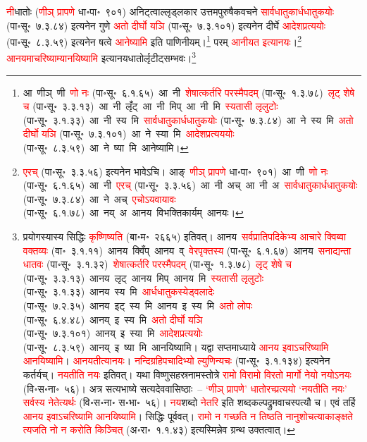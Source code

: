 \fontsize{14}{21}\selectfont\begin{sloppypar}\justifying\noindent\hspace{10mm} \textcolor{red}{नी}\-धातोः (\textcolor{red}{णीञ् प्रापणे} धा॰पा॰~९०१) अनिट्त्वाल्लृड्लकार उत्तम\-पुरुषैक\-वचने \textcolor{red}{सार्वधातुकार्धधातुकयोः} (पा॰सू॰~७.३.८४) इत्यनेन गुणे \textcolor{red}{अतो दीर्घो यञि} (पा॰सू॰~७.३.१०१) इत्यनेन दीर्घे \textcolor{red}{आदेश\-प्रत्ययोः} (पा॰सू॰~८.३.५९) इत्यनेन षत्वे \textcolor{red}{आनेष्यामि} इति पाणिनीयम्।\footnote{आ~णीञ्~\arrow णी~\arrow \textcolor{red}{णो नः} (पा॰सू॰~६.१.६५)~\arrow आ~नी~\arrow \textcolor{red}{शेषात्कर्तरि परस्मैपदम्} (पा॰सू॰~१.३.७८)~\arrow \textcolor{red}{लृट् शेषे च} (पा॰सू॰~३.३.१३)~\arrow आ~नी~लृँट्~\arrow आ~नी~मिप्~\arrow आ~नी~मि~\arrow \textcolor{red}{स्यतासी लृलुटोः} (पा॰सू॰~३.१.३३)~\arrow आ~नी~स्य~मि~\arrow \textcolor{red}{सार्वधातुकार्ध\-धातुकयोः} (पा॰सू॰~७.३.८४)~\arrow आ~ने~स्य~मि~\arrow \textcolor{red}{अतो दीर्घो यञि} (पा॰सू॰~७.३.१०१)~\arrow आ~ने~स्या~मि~\arrow \textcolor{red}{आदेश\-प्रत्यययोः} (पा॰सू॰~८.३.५९)~\arrow आ~ने~ष्या~मि~\arrow आनेष्यामि।} परम् \textcolor{red}{आनीयत इत्यानयः}।\footnote{\textcolor{red}{एरच्} (पा॰सू॰~३.३.५६) इत्यनेन भावेऽचि। आङ्~\textcolor{red}{णीञ् प्रापणे} धा॰पा॰~९०१)~\arrow आ~णी~\arrow \textcolor{red}{णो नः} (पा॰सू॰~६.१.६५)~\arrow आ~नी~\arrow \textcolor{red}{एरच्} (पा॰सू॰~३.३.५६)~\arrow आ~नी~अच्~\arrow आ~नी~अ~\arrow \textcolor{red}{सार्वधातुकार्ध\-धातुकयोः} (पा॰सू॰~७.३.८४)~\arrow आ~ने~अच्~\arrow \textcolor{red}{एचोऽयवायावः} (पा॰सू॰~६.१.७८)~\arrow आ~नय्~अ~\arrow आनय~\arrow विभक्तिकार्यम्~\arrow आनयः।} \textcolor{red}{आनयमाचरिष्याम्यानयिष्यामि} इत्यानय\-धातोर्लृटीट्सम्भवः।\footnote{प्रयोगस्यास्य सिद्धिः \textcolor{red}{कृष्णिष्यति} (बा॰म॰~२६६५) इतिवत्। आनय~\arrow \textcolor{red}{सर्वप्राति\-पदिकेभ्य आचारे क्विब्वा वक्तव्यः} (वा॰~३.१.११)~\arrow आनय~क्विँप्~\arrow आनय~व्~\arrow \textcolor{red}{वेरपृक्तस्य} (पा॰सू॰~६.१.६७)~\arrow आनय~\arrow \textcolor{red}{सनाद्यन्ता धातवः} (पा॰सू॰~३.१.३२)~\arrow \textcolor{red}{शेषात्कर्तरि परस्मैपदम्} (पा॰सू॰~१.३.७८)~\arrow \textcolor{red}{लृट् शेषे च} (पा॰सू॰~३.३.१३)~\arrow आनय~लृट्~\arrow आनय~मिप्~\arrow आनय~मि~\arrow \textcolor{red}{स्यतासी लृलुटोः} (पा॰सू॰~३.१.३३)~\arrow आनय~स्य~मि~\arrow \textcolor{red}{आर्धधातुकस्येड्वलादेः} (पा॰सू॰~७.२.३५)~\arrow आनय~इट्~स्य~मि~\arrow आनय~इ~स्य~मि~\arrow \textcolor{red}{अतो लोपः} (पा॰सू॰~६.४.४८)~\arrow आनय्~इ~स्य~मि~\arrow \textcolor{red}{अतो दीर्घो यञि} (पा॰सू॰~७.३.१०१)~\arrow आनय्~इ~स्या~मि~\arrow \textcolor{red}{आदेश\-प्रत्ययोः} (पा॰सू॰~८.३.५९)~\arrow आनय्~इ~ष्या~मि~\arrow आनयिष्यामि। यद्वा सप्तमाध्याये \textcolor{red}{आनय इवाऽचरिष्यामि आनयिष्यामि}। \textcolor{red}{आनयतीत्यानयः}। \textcolor{red}{नन्दि\-ग्रहि\-पचादिभ्यो ल्युणिन्यचः} (पा॰सू॰~३.१.१३४) इत्यनेन कर्तर्यच्। \textcolor{red}{नयतीति नयः} इतिवत्। यथा विष्णु\-सहस्र\-नाम\-स्तोत्रे \textcolor{red}{रामो विरामो विरतो मार्गो नेयो नयोऽनयः} (वि॰स॰ना॰~५६)। अत्र सत्यभाष्ये सत्यदेव\-वासिष्ठाः~– \textcolor{red}{‘णीञ् प्रापणे’ धातोरच्प्रत्ययो ‘नयतीति नयः’ सर्वस्य नेतेत्यर्थः} (वि॰स॰ना॰ स॰भा॰~५६)। \textcolor{red}{नय}\-शब्दो \textcolor{red}{नेतरि} इति शब्दकल्पद्रुम\-वाचस्पत्यौ च। एवं तर्हि \textcolor{red}{आनय इवाऽचरिष्यामि आनयिष्यामि}। सिद्धिः पूर्ववत्। \textcolor{red}{रामो न गच्छति न तिष्ठति नानुशोचत्याकाङ्क्षते त्यजति नो न करोति किञ्चित्} (अ॰रा॰~१.१.४३) इत्यस्मिन्नेव ग्रन्थ उक्तत्वात्।}\end{sloppypar}
